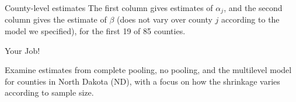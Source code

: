 \documentclass[ignorenonframetext,]{beamer}
\begin{document}
\begin{frame}[fragile]{County-level estimates}
The first column gives estimates of \(\alpha_j\), and the second column
gives the estimate of \(\beta\) (does not vary over county \(j\)
according to the model we specified), for the first 19 of 85 counties.

\end{frame}

\begin{frame}{Your Job!}

Examine estimates from complete pooling, no pooling, and the multilevel
model for counties in North Dakota (ND), with a focus on how the
shrinkage varies according to sample size.

\end{frame}
\end{document}
